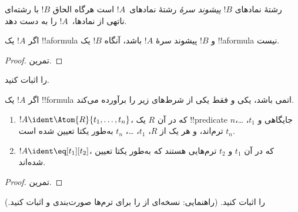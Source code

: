 \documentclass[../../../include/open-logic-section]{subfiles}
\begin{document}
\begin{defn}
رشتهٔ نمادهای $!B$ \emph{پیشوند سرهٔ} رشتهٔ نمادهای~$!A$ است هرگاه الحاق
$!B$ با رشته‌ای ناتهی از نمادها،~$!A$ را به دست دهد.
\end{defn}

\begin{lem}
اگر $!A$ یک !!a{formula} و $!B$ پیشوند سرهٔ $!A$ باشد، آنگاه $!B$ یک
!!a{formula} نیست.
\end{lem}

\begin{proof}
تمرین.
\end{proof}

\begin{prob}
 را اثبات کنید.
\end{prob}

\begin{prop}
اگر $!A$ یک !!{formula} اتمی باشد، یکی و فقط یکی از شرط‌های زیر را برآورده
می‌کند.
\begin{enumerate}
\item $!A \ident \Atom{R}{t_1,\dots,t_n}$، که در آن $R$ یک
  !!{predicate} $n$جایگاهی و $t_1$، \dots، $t_n$ ترم‌اند، و هر یک از
  $R$، $t_1$، \dots، $t_n$ به‌طور یکتا تعیین شده است.
\item $!A \ident \eq[t_1][t_2]$، که در آن $t_1$ و $t_2$ ترم‌هایی هستند
  که به‌طور یکتا تعیین شده‌اند.
\end{enumerate}
\end{prop}

\begin{proof}
تمرین.
\end{proof}

\begin{prob}
 را اثبات کنید. (راهنمایی: نسخه‌ای
از  را برای ترم‌ها صورت‌بندی و اثبات
کنید.)
\end{prob}
\end{document}

